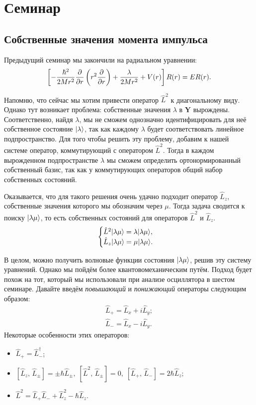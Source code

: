 \section{Семинар \thesection}\label{sem:angular-momentum}
\subsection{Собственные значения момента импульса}
Предыдущий семинар мы закончили на радиальном уравнении:
\[
  \left[-\frac{\hbar^2}{2Mr^2}\frac{\partial }{\partial r}\left( r^2 \frac{\partial }{\partial r}\right)  + \frac{\lambda}{2Mr^2} + V(r)\right]R(r) = ER(r).
\]

Напомню, что сейчас мы хотим привести оператор $\hat{L}^2$ к диагональному
виду. Однако тут возникает проблема: собственные значения $\lambda$ в
$\mathbf{Y}$ вырождены. Соответственно, найдя $\lambda$, мы не сможем
однозначно идентифицировать для неё собственное состояние $\lvert\lambda\rangle$, так
как каждому $\lambda$ будет соответствовать линейное подпространство. Для того
чтобы решить эту проблему, добавим к нашей системе оператор, коммутирующий с
оператором $\hat{L}^2$. Тогда в каждом вырожденном подпространстве $\lambda$ мы
сможем определить ортонормированный собственный базис, так как у коммутирующих
операторов общий набор собственных состояний.

Оказывается, что для такого решения очень удачно подходит оператор $\hat{L}_z$,
собственные значения которого мы обозначим через $\mu$. Тогда задача сводится к
поиску $\lvert\lambda\mu\rangle$, то есть собственных состояний для операторов
$\hat{L}^2$ и $\hat{L}_z$.
\[
  \begin{cases}
    \hat{L}^2\lvert\lambda\mu\rangle = \lambda\lvert\lambda\mu\rangle,\\
    \hat{L}_z\lvert\lambda\mu\rangle = \mu\lvert\lambda\mu\rangle.
  \end{cases}
\]

В целом, можно получить волновые функции состояния $\lvert\lambda\mu\rangle$, решив
эту систему уравнений. Однако мы пойдём более квантовомеханическим путём.
Подход будет похож на тот, который мы использовали при анализе осциллятора в
шестом семинаре. Давайте введём \textit{повышающий} и \textit{понижающий}
операторы следующим образом:
\begin{equation*}
  \begin{split}
    \hat{L}_+ = \hat{L}_x + i\hat{L}_y;  \\
    \hat{L}_- = \hat{L}_x - i\hat{L}_y.
  \end{split}
\end{equation*}
Некоторые особенности этих операторов:
\begin{itemize}
  \item $\hat{L}_+ = \hat{L}^{\dagger}_-$;
  \item $[\hat{L}_z, \, \hat{L}_{\pm}] = \pm\hbar \hat{L}_{\pm},\; [\hat{L}^2, \,
            \hat{L}_{\pm}] = 0, \; [\hat{L}_+, \, \hat{L}_- ] = 2\hbar \hat{L}_z; $
  \item $\hat{L}^2 = \hat{L}_+\hat{L}_- + \hat{L}^2_z - \hbar\hat{L}_z.$
\end{itemize}

